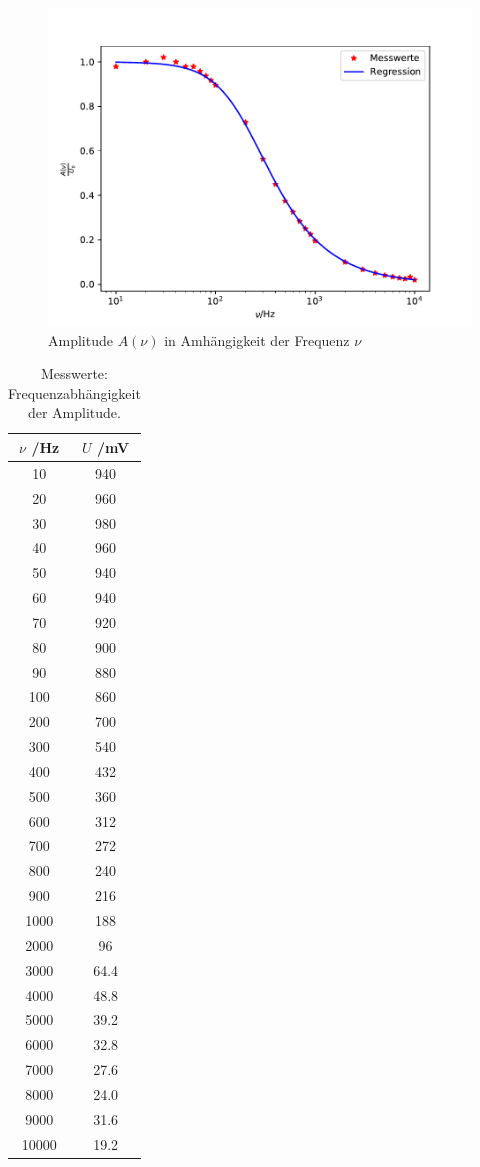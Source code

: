 \begin{figure}
  \centering
  \includegraphics[scale = 0.7]{plotB.pdf}
  \caption{Amplitude $A(\nu)$ in Amhängigkeit der Frequenz $\nu$}
  \label{Plot2}
\end{figure}

\begin{table}
  \centering
  \caption{Messwerte: Frequenzabhängigkeit der Amplitude.}
  \label{table2}
  \begin{tabular}{c c}
    \toprule
    $\nu$ /Hz & $U$ /mV \\
    \midrule
    10 & 940\\
    20 & 960\\
    30 & 980\\
    40 & 960\\
    50 & 940\\
    60 & 940\\
    70 & 920\\
    80 & 900\\
    90 & 880\\
    100 & 860\\
    200 & 700\\
    300 & 540\\
    400 & 432\\
    500 & 360\\
    600 & 312\\
    700 & 272\\
    800 & 240\\
    900 & 216\\
    1000 & 188 \\
    2000 & 96\\
    3000 & 64.4\\
    4000 & 48.8\\
    5000 & 39.2\\
    6000 & 32.8\\
    7000 & 27.6\\
    8000 & 24.0\\
    9000 & 31.6\\
    10000 &  19.2\\
    \bottomrule
  \end{tabular}
\end{table}

